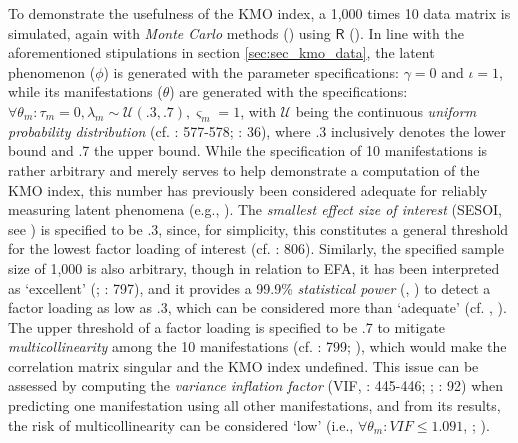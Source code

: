 \documentclass[
  10pt,
  a4paper,
  twoside]{article}
\begin{document}
To demonstrate the usefulness of the KMO index, a 1,000 times 10 data matrix is simulated, again with \emph{Monte Carlo} methods () using \(\textsf{R}\) (). In line with the aforementioned stipulations in section \ref{sec:sec_kmo_data}, the latent phenomenon (\(\phi\)) is generated with the parameter specifications: \(\gamma = 0\) and \(\iota = 1\), while its manifestations (\(\theta\)) are generated with the specifications: \(\forall \theta_m: \tau_m = 0, \lambda_m \sim \mathcal{U}(.3, .7), \varsigma_m = 1\), with \(\mathcal{U}\) being the continuous \emph{uniform probability distribution} (cf. : 577-578; : 36), where .3 inclusively denotes the lower bound and .7 the upper bound. While the specification of 10 manifestations is rather arbitrary and merely serves to help demonstrate a computation of the KMO index, this number has previously been considered adequate for reliably measuring latent phenomena (e.g., ). The \emph{smallest effect size of interest} (SESOI, see ) is specified to be .3, since, for simplicity, this constitutes a general threshold for the lowest factor loading of interest (cf. : 806). Similarly, the specified sample size of 1,000 is also arbitrary, though in relation to EFA, it has been interpreted as `excellent' (; : 797), and it provides a 99.9\% \emph{statistical power} (, ) to detect a factor loading as low as .3, which can be considered more than `adequate' (cf. , ). The upper threshold of a factor loading is specified to be .7 to mitigate \emph{multicollinearity} among the 10 manifestations (cf. : 799; ), which would make the correlation matrix singular and the KMO index undefined. This issue can be assessed by computing the \emph{variance inflation factor} (VIF, : 445-446; ; : 92) when predicting one manifestation using all other manifestations, and from its results, the risk of multicollinearity can be considered `low' (i.e., \(\forall \theta_m: VIF \leq 1.091\), ; ).
\end{document}
